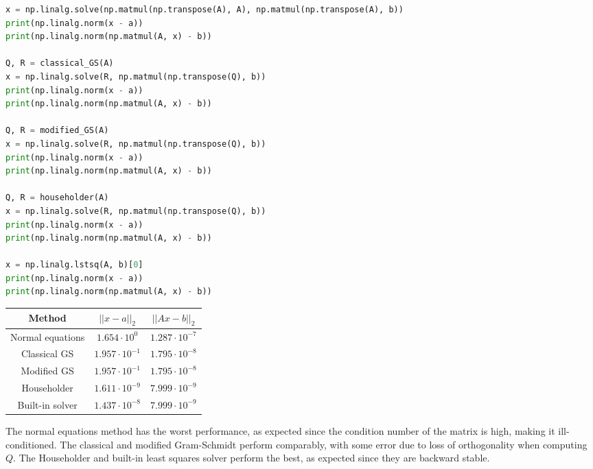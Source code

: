 \documentclass{article}
\begin{document}
\begin{lstlisting}[language=Python]
x = np.linalg.solve(np.matmul(np.transpose(A), A), np.matmul(np.transpose(A), b))
print(np.linalg.norm(x - a))
print(np.linalg.norm(np.matmul(A, x) - b))

Q, R = classical_GS(A)
x = np.linalg.solve(R, np.matmul(np.transpose(Q), b))
print(np.linalg.norm(x - a))
print(np.linalg.norm(np.matmul(A, x) - b))

Q, R = modified_GS(A)
x = np.linalg.solve(R, np.matmul(np.transpose(Q), b))
print(np.linalg.norm(x - a))
print(np.linalg.norm(np.matmul(A, x) - b))

Q, R = householder(A)
x = np.linalg.solve(R, np.matmul(np.transpose(Q), b))
print(np.linalg.norm(x - a))
print(np.linalg.norm(np.matmul(A, x) - b))

x = np.linalg.lstsq(A, b)[0]
print(np.linalg.norm(x - a))
print(np.linalg.norm(np.matmul(A, x) - b))
\end{lstlisting}
\begin{center}
\begin{tabular}{|c|c|c|}
    \hline
    Method & $||x - a||_2$ & $||Ax - b||_2$ \\
    \hline
    Normal equations & $1.654 \cdot 10^0$ & $1.287 \cdot 10^{-7}$ \\
    \hline
    Classical GS & $1.957 \cdot 10^{-1}$ & $1.795 \cdot 10^{-8}$ \\
    \hline
    Modified GS & $1.957 \cdot 10^{-1}$ & $1.795 \cdot 10^{-8}$ \\
    \hline
    Householder & $1.611 \cdot 10^{-9}$ & $7.999 \cdot 10^{-9}$ \\
    \hline
    Built-in solver & $1.437 \cdot 10^{-8}$ & $7.999 \cdot 10^{-9}$ \\
    \hline
\end{tabular}
\end{center}
The normal equations method has the worst performance, as expected since the condition number of the matrix is high, making it ill-conditioned. The classical and modified Gram-Schmidt perform comparably, with some error due to loss of orthogonality when computing $Q$. The Householder and built-in least squares solver perform the best, as expected since they are backward stable.
\end{document}

